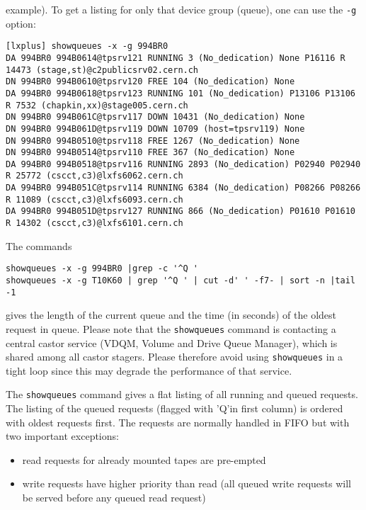 example). To get a listing for only that device group (queue), one can use the {\tt -g} option:
\small
\begin{verbatim}
[lxplus] showqueues -x -g 994BR0
DA 994BR0 994B0614@tpsrv121 RUNNING 3 (No_dedication) None P16116 R 14473 (stage,st)@c2publicsrv02.cern.ch
DN 994BR0 994B0610@tpsrv120 FREE 104 (No_dedication) None
DA 994BR0 994B0618@tpsrv123 RUNNING 101 (No_dedication) P13106 P13106 R 7532 (chapkin,xx)@stage005.cern.ch
DN 994BR0 994B061C@tpsrv117 DOWN 10431 (No_dedication) None
DN 994BR0 994B061D@tpsrv119 DOWN 10709 (host=tpsrv119) None
DN 994BR0 994B0510@tpsrv118 FREE 1267 (No_dedication) None
DN 994BR0 994B0514@tpsrv110 FREE 367 (No_dedication) None
DA 994BR0 994B0518@tpsrv116 RUNNING 2893 (No_dedication) P02940 P02940 R 25772 (cscct,c3)@lxfs6062.cern.ch
DA 994BR0 994B051C@tpsrv114 RUNNING 6384 (No_dedication) P08266 P08266 R 11089 (cscct,c3)@lxfs6093.cern.ch
DA 994BR0 994B051D@tpsrv127 RUNNING 866 (No_dedication) P01610 P01610 R 14302 (cscct,c3)@lxfs6101.cern.ch
\end{verbatim}
\normalsize

The commands
\small
\begin{verbatim}
showqueues -x -g 994BR0 |grep -c '^Q '
showqueues -x -g T10K60 | grep '^Q ' | cut -d' ' -f7- | sort -n |tail -1
\end{verbatim}
\normalsize
gives the length of the current queue and the time (in seconds) of the oldest request in queue.
Please note that the {\tt showqueues} command is contacting a central castor service (VDQM, Volume
and Drive Queue Manager), which is shared among all castor stagers. Please therefore avoid using
{\tt showqueues} in a tight loop since this may degrade the performance of that service.

The {\tt showqueues} command gives a flat listing of all running and queued requests. The listing
of the queued requests (flagged with 'Q'in first column) is ordered with oldest requests first.
The requests are normally handled in FIFO but with two important exceptions:
\begin{itemize}
\item read requests for already mounted tapes are pre-empted
\item write requests have higher priority than read (all queued write requests will be served
before any queued read request)
\end{itemize}

